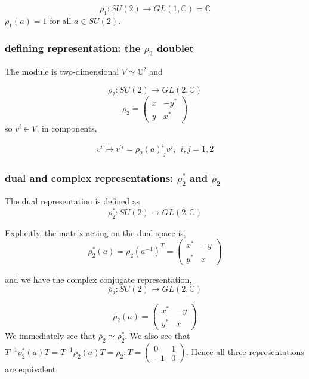 \begin{enumerate}
\begin{equation}
    \rho_1: SU(2)\rightarrow GL(1, \mathbb{C}) =\mathbb{C}
\end{equation}
$\rho_1(a) = 1$ for all $a\in SU(2)$.

\subsubsection{defining representation: the $\rho_2$ doublet}
The module is two-dimensional $V\simeq \mathbb{C}^2$ and 

\begin{equation}
    \rho_2: SU(2)\rightarrow GL(2, \mathbb{C})
\end{equation}
\begin{equation}
    \rho_2 = \begin{pmatrix}
        x & -y^*\\
        y & x^*
    \end{pmatrix}
\end{equation}
so $v^i\in V$, in components, 

\begin{equation}
    v^i\mapsto v^{'i} = \rho_2(a)^{i}_{\ j} v^j, \ \ i,j = 1,2
\end{equation}


\subsubsection{dual and complex representations: $\rho^*_{2}$ and $\overline{\rho}_2$}
The dual representation is defined as
\begin{equation}
    \rho^*_2: SU(2)\rightarrow GL(2, \mathbb{C})
\end{equation}

Explicitly, the matrix acting on the dual space is, 
\begin{equation}
    \rho^*_2(a) = \rho_2(a^{-1})^T = \begin{pmatrix}
        x^*&-y\\
        y^*& x
    \end{pmatrix}
\end{equation}

and we have the complex conjugate representation, 
\begin{equation}
    \overline{\rho}_2: SU(2)\rightarrow GL(2, \mathbb{C})
\end{equation}

\begin{equation}
    \overline{\rho}_2(a) = \begin{pmatrix}
        x^*&-y\\
        y^*& x
    \end{pmatrix}
\end{equation}
We immediately see that $\overline{\rho}_2\simeq \rho^*_2$. We also see that $T^{-1}\rho^*_2(a)T = T^{-1}\overline{\rho}_2(a)T = \rho_2: T =\begin{pmatrix}0&1\\-1&0\end{pmatrix}$. Hence all three representations are equivalent. 

\end{enumerate}

